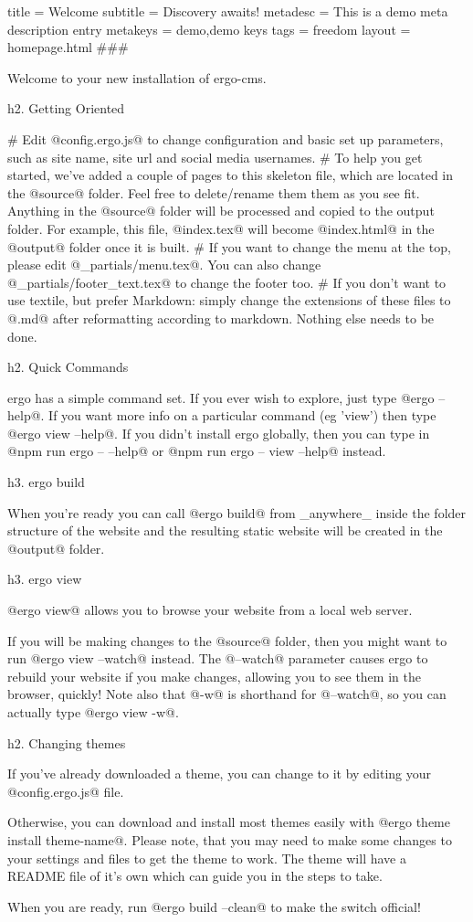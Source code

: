 title = Welcome
subtitle = Discovery awaits!
metadesc = This is a demo meta description entry
metakeys = demo,demo keys
tags = freedom
layout = homepage.html
###

Welcome to your new installation of ergo-cms.


h2. Getting Oriented

# Edit @config.ergo.js@ to change configuration and basic set up parameters, such as site name, site url and social media usernames.
# To help you get started, we've added a couple of pages to this skeleton file, which are located in the @source@ folder. Feel free to delete/rename them them as you see fit. 
Anything in the @source@ folder will be processed and copied to the output folder. For example, this file, @index.tex@ will become @index.html@ in the @output@ folder once it is built.
# If you want to change the menu at the top, please edit @_partials/menu.tex@. You can also change @_partials/footer_text.tex@ to change the footer too.
# If you don't want to use textile, but prefer Markdown: simply change the extensions of these files to @.md@ after reformatting according to markdown. Nothing else needs to be done. 


h2. Quick Commands

ergo has a simple command set. If you ever wish to explore, just type @ergo --help@. If you want more info on a particular command (eg 'view') then type @ergo view --help@. If you didn't install ergo globally, then you can type in @npm run ergo -- --help@ or @npm run ergo -- view --help@ instead.

h3. ergo build

When you're ready you can call @ergo build@ from _anywhere_ inside the folder structure of the website and the resulting static website will be created in the @output@ folder.


h3. ergo view

@ergo view@ allows you to browse your website from a local web server.

If you will be making changes to the @source@ folder, then you might want to run @ergo view --watch@ instead. The @--watch@ parameter causes ergo to rebuild your website if you make changes, allowing you to see them in the browser, quickly! Note also that @-w@ is shorthand for @--watch@, so you can actually type @ergo view -w@.

h2. Changing themes

If you've already downloaded a theme, you can change to it by editing your @config.ergo.js@ file. 

Otherwise, you can download and install most themes easily with @ergo theme install theme-name@. Please note, that you may need to make some changes to your settings and files to get the theme to work. The theme will have a README file of it's own which can guide you in the steps to take. 

When you are ready, run @ergo build --clean@ to make the switch official!
